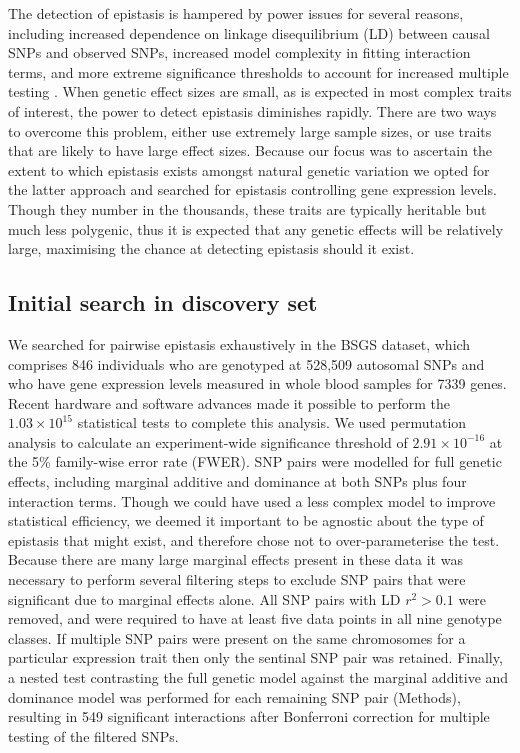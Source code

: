 \documentclass{article}
\begin{document}
The detection of epistasis is hampered by power issues for several reasons, including increased dependence on linkage disequilibrium (LD) between causal SNPs and observed SNPs, increased model complexity in fitting interaction terms, and more extreme significance thresholds to account for increased multiple testing \cite{Hemani2013}. When genetic effect sizes are small, as is expected in most complex traits of interest, the power to detect epistasis diminishes rapidly. There are two ways to overcome this problem, either use extremely large sample sizes, or use traits that are likely to have large effect sizes. Because our focus was to ascertain the extent to which epistasis exists amongst natural genetic variation we opted for the latter approach and searched for epistasis controlling gene expression levels. Though they number in the thousands, these traits are typically heritable but much less polygenic, thus it is expected that any genetic effects will be relatively large, maximising the chance at detecting epistasis should it exist.


\subsection{Initial search in discovery set}
We searched for pairwise epistasis exhaustively in the BSGS dataset, which comprises 846 individuals who are genotyped at 528,509 autosomal SNPs and who have gene expression levels measured in whole blood samples for 7339 genes. Recent hardware and software advances made it possible to perform the $1.03 \times 10^{15}$ statistical tests to complete this analysis. We used permutation analysis to calculate an experiment-wide significance threshold of $2.91 \times 10^{-16}$ at the 5\% family-wise error rate (FWER). SNP pairs were modelled for full genetic effects, including marginal additive and dominance at both SNPs plus four interaction terms. Though we could have used a less complex model to improve statistical efficiency, we deemed it important to be agnostic about the type of epistasis that might exist, and therefore chose not to over-parameterise the test. Because there are many large marginal effects present in these data it was necessary to perform several filtering steps to exclude SNP pairs that were significant due to marginal effects alone. All SNP pairs with LD $r^2 > 0.1$ were removed, and were required to have at least five data points in all nine genotype classes. If multiple SNP pairs were present on the same chromosomes for a particular expression trait then only the sentinal SNP pair was retained. Finally, a nested test contrasting the full genetic model against the marginal additive and dominance model was performed for each remaining SNP pair (Methods), resulting in 549 significant interactions after Bonferroni correction for multiple testing of the filtered SNPs.
\end{document}
